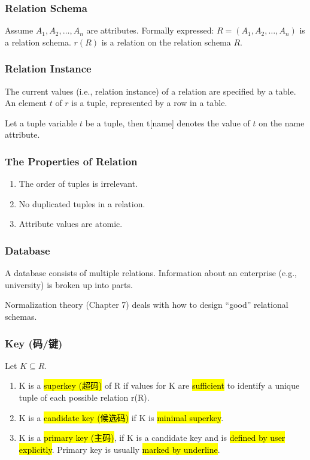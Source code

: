 \subsubsection{Relation Schema}
Assume $A_1,A_2,\dots,A_n$ are attributes. Formally expressed: $R=(A_1,A_2,\dots,A_n)$ is a relation schema. $r(R)$ is a relation on the relation schema $R$. 

\subsubsection{Relation Instance}
The current values (i.e., relation instance) of a relation are specified by a table. An element $t$ of $r$ is a tuple, represented by a row in a table. 

Let a tuple variable $t$ be a tuple, then t[name] denotes the value of $t$ on the name attribute.

\subsubsection{The Properties of Relation}
\begin{enumerate}
    \item The order of tuples is irrelevant. 
    \item No duplicated tuples in a relation.
    \item Attribute values are atomic.
\end{enumerate}

\subsubsection{Database}
A database consists of multiple relations. Information about an enterprise (e.g., university) is broken up into parts. 

Normalization theory (Chapter 7) deals with how to design ``good'' relational schemas. 


\subsubsection{Key (码/键)}
Let $K \subseteq R$. 
\begin{enumerate}
    \item K is a \hl{superkey (超码)} of R if values for K are \hl{sufficient} to identify a unique tuple of each possible relation r(R). 
    \item K is a \hl{candidate key (候选码)} if K is \hl{minimal superkey}.
    \item K is a \hl{primary key (主码)}, if K is a candidate key and is \hl{defined by user explicitly}. Primary key is usually \hl{marked by underline}. 
\end{enumerate}

